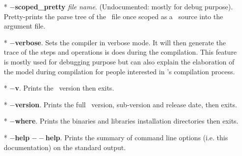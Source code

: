 \begin{itemize}
 \item[*] {\bf $-$scoped\_pretty} {\em file name}. (Undocumented:
   mostly for debug purpose). Pretty-prints the parse tree of the
   \focal\ file once scoped as a \focal\ source into the argument
   file.

  \item[*] {\bf $-$verbose}. Sets the compiler in verbose mode. It
    will then generate the trace of the steps and operations is does
    during the compilation. This feature is mostly used for debugging
    purpose but can also explain the elaboration of the model during
    compilation for people interested in \focal's compilation
    process.

  \item[*] {\bf $-$v}. Prints the \focal\ version then exits.

  \item[*] {\bf $-$version}. Prints the full \focal\ version,
    sub-version and release date, then exits.

  \item[*] {\bf $-$where}. Prints the binaries and libraries
    installation directories then exits.

  \item[*] {\bf $-$help} {\bf $--$help}. Prints the summary of command
    line options (i.e. this documentation) on the standard output.
\end{itemize}
